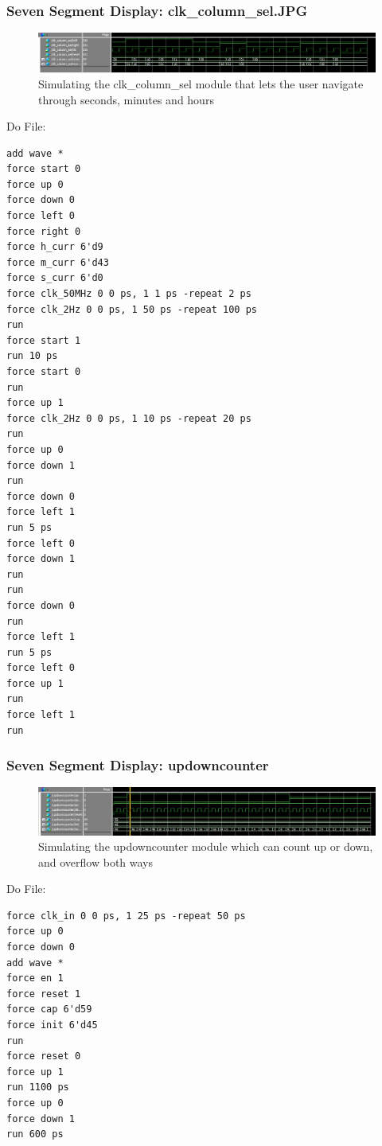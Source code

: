 \documentclass[a4paper]{article}
\begin{document}
\subsubsection{Seven Segment Display: clk_column_sel.JPG}
\begin{figure}[H]
    \includegraphics[width=0.8 \linewidth]{images/clk_column_sel_sim}
    \caption{Simulating the clk_column_sel module that lets the user navigate through seconds, minutes and hours}
    \label{clk_column_sel_sim}
\end{figure}

Do File:
\begin{Verbatim}
add wave *
force start 0
force up 0
force down 0
force left 0
force right 0
force h_curr 6'd9
force m_curr 6'd43
force s_curr 6'd0
force clk_50MHz 0 0 ps, 1 1 ps -repeat 2 ps
force clk_2Hz 0 0 ps, 1 50 ps -repeat 100 ps
run
force start 1
run 10 ps
force start 0
run
force up 1
force clk_2Hz 0 0 ps, 1 10 ps -repeat 20 ps
run
force up 0
force down 1
run
force down 0
force left 1
run 5 ps
force left 0
force down 1
run
run
force down 0
run
force left 1
run 5 ps
force left 0
force up 1
run
force left 1
run
\end{Verbatim}

\subsubsection{Seven Segment Display: updowncounter}
\begin{figure}[H]
    \includegraphics[width=0.8 \linewidth]{images/updowncounter_sim.JPG}
    \caption{Simulating the updowncounter module which can count up or down, and overflow both ways}
    \label{updowncounter_sim}
\end{figure}

Do File:
\begin{Verbatim}
force clk_in 0 0 ps, 1 25 ps -repeat 50 ps
force up 0
force down 0
add wave *
force en 1
force reset 1
force cap 6'd59
force init 6'd45
run
force reset 0
force up 1
run 1100 ps
force up 0
force down 1
run 600 ps
\end{Verbatim}

%
\end{document}
